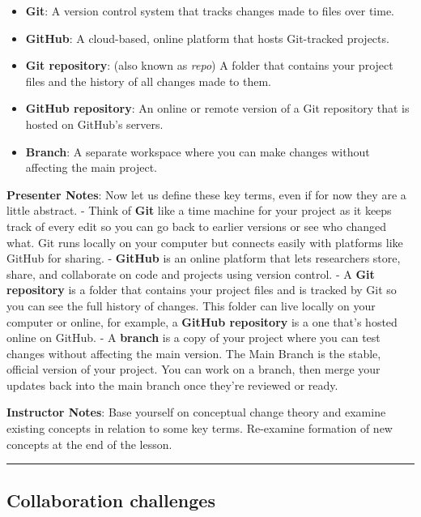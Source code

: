 \documentclass[
  letterpaper,
  DIV=11,
  numbers=noendperiod]{scrartcl}
\providecommand{\tightlist}{%
  \setlength{\itemsep}{0pt}\setlength{\parskip}{0pt}}
\begin{document}
\begin{itemize}
\tightlist
\item
  \textbf{Git}: A version control system that tracks changes made to
  files over time.\\
\item
  \textbf{GitHub}: A cloud-based, online platform that hosts Git-tracked
  projects.
\item
  \textbf{Git repository}: (also known as \emph{repo}) A folder that
  contains your project files and the history of all changes made to
  them.
\item
  \textbf{GitHub repository}: An online or remote version of a Git
  repository that is hosted on GitHub's servers.
\item
  \textbf{Branch}: A separate workspace where you can make changes
  without affecting the main project.
\end{itemize}

\textbf{Presenter Notes}: Now let us define these key terms, even if for
now they are a little abstract. - Think of \textbf{Git} like a time
machine for your project as it keeps track of every edit so you can go
back to earlier versions or see who changed what. Git runs locally on
your computer but connects easily with platforms like GitHub for
sharing. - \textbf{GitHub} is an online platform that lets researchers
store, share, and collaborate on code and projects using version
control. - A \textbf{Git repository} is a folder that contains your
project files and is tracked by Git so you can see the full history of
changes. This folder can live locally on your computer or online, for
example, a \textbf{GitHub repository} is a one that's hosted online on
GitHub. - A \textbf{branch} is a copy of your project where you can test
changes without affecting the main version. The Main Branch is the
stable, official version of your project. You can work on a branch, then
merge your updates back into the main branch once they're reviewed or
ready.

\textbf{Instructor Notes}: Base yourself on conceptual change theory and
examine existing concepts in relation to some key terms. Re-examine
formation of new concepts at the end of the lesson.

\begin{center}\rule{0.5\linewidth}{0.5pt}\end{center}

\subsection{Collaboration challenges}\label{collaboration-challenges}
\end{document}

